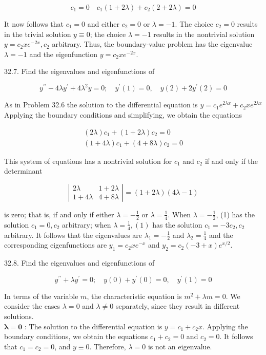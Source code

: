 \documentclass[10pt]{article}
\begin{document}
$$
c_{1}=0 \quad c_{1}(1+2 \lambda)+c_{2}(2+2 \lambda)=0
$$

It now follows that $c_{1}=0$ and either $c_{2}=0$ or $\lambda=-1$. The choice $c_{2}=0$ results in the trivial solution $y \equiv 0$; the choice $\lambda=-1$ results in the nontrivial solution $y=c_{2} x e^{-2 x}, c_{2}$ arbitrary. Thus, the boundary-value problem has the eigenvalue $\lambda=-1$ and the eigenfunction $y=c_{2} x e^{-2 x}$.

32.7. Find the eigenvalues and eigenfunctions of

$$
y^{\prime \prime}-4 \lambda y^{\prime}+4 \lambda^{2} y=0 ; \quad y^{\prime}(1)=0, \quad y(2)+2 y^{\prime}(2)=0
$$

As in Problem 32.6 the solution to the differential equation is $y=c_{1} e^{2 \lambda x}+c_{2} x e^{2 \lambda x}$ Applying the boundary conditions and simplifying, we obtain the equations

\[
\begin{array}{r}
(2 \lambda) c_{1}+(1+2 \lambda) c_{2}=0 \\
(1+4 \lambda) c_{1}+(4+8 \lambda) c_{2}=0 \tag{1}
\end{array}
\]

This system of equations has a nontrivial solution for $c_{1}$ and $c_{2}$ if and only if the determinant

$$
\left|\begin{array}{cc}
2 \lambda & 1+2 \lambda \\
1+4 \lambda & 4+8 \lambda
\end{array}\right|=(1+2 \lambda)(4 \lambda-1)
$$

is zero; that is, if and only if either $\lambda=-\frac{1}{2}$ or $\lambda=\frac{1}{4}$. When $\lambda=-\frac{1}{2}$, (1) has the solution $c_{1}=0, c_{2}$ arbitrary; when $\lambda=\frac{1}{4},(1)$ has the solution $c_{1}=-3 c_{2}, c_{2}$ arbitrary. It follows that the eigenvalues are $\lambda_{1}=-\frac{1}{2}$ and $\lambda_{2}=\frac{1}{4}$ and the corresponding eigenfunctions are $y_{1}=c_{2} x e^{-x}$ and $y_{2}=c_{2}(-3+x) e^{x / 2}$.

32.8. Find the eigenvalues and eigenfunctions of

$$
y^{\prime \prime}+\lambda y^{\prime}=0 ; \quad y(0)+y^{\prime}(0)=0, \quad y^{\prime}(1)=0
$$

In terms of the variable $m$, the characteristic equation is $m^{2}+\lambda m=0$. We consider the cases $\lambda=0$ and $\lambda \neq 0$ separately, since they result in different solutions.\\
$\boldsymbol{\lambda}=\mathbf{0}$ : The solution to the differential equation is $y=c_{1}+c_{2} x$. Applying the boundary conditions, we obtain the equations $c_{1}+c_{2}=0$ and $c_{2}=0$. It follows that $c_{1}=c_{2}=0$, and $y \equiv 0$. Therefore, $\lambda=0$ is not an eigenvalue.
\end{document}
